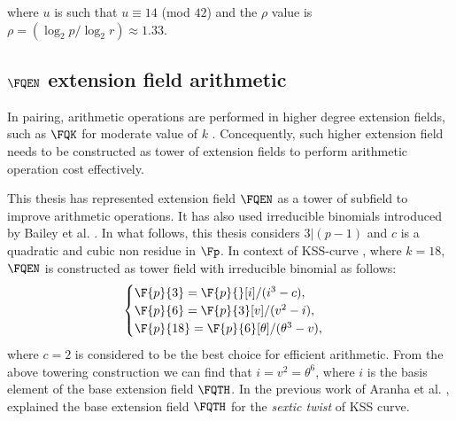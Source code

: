         where $u$ is such that $u \equiv 14$ (mod $42$) and the $\rho$ value is $\rho = (\log_2 p/\log_2 r) \approx 1.33$.
        
        
        
        \subsection{$\FQEN$ extension field arithmetic}
        In pairing, arithmetic  operations are performed in higher degree extension fields, such as $\FQK$  for moderate value of $k$ \cite{Silverman}. Concequently, such higher extension field needs to be constructed as tower of extension fields \cite{EPRINT:BenSco09} to perform arithmetic operation cost effectively.
        
        This thesis has  represented extension field $\FQEN$ as a tower of subfield to improve arithmetic operations. It has also used irreducible binomials introduced by Bailey et al. \cite{JC:BaiPaa01}. In what follows, this thesis considers $3|(p-1)$ and $c$ is a quadratic and cubic non residue in $\Fp$. In context  of KSS-curve \cite{EPRINT:KacSchSco07}, where $k=18$, $\FQEN$ is constructed as tower field with irreducible binomial as follows:
        \begin{equation}\label{eq:KSS_towering}
        \begin{cases}
        \F{p}{3} = \F{p}{}[i]/(i^3-c),  \\ 
        \F{p}{6} = \F{p}{3}[v]/(v^2-i),  \\ 
        \F{p}{18} = \F{p}{6}[\theta]/(\theta^3-v), \\ 
        \end{cases}
        \end{equation}
        where $c = 2$ is considered to be the best choice for efficient arithmetic.
        From the above towering construction we can find that $i=v^2=\theta^6$, where $i$ is the basis element of the base extension field $\FQTH$. 
        In the previous work of Aranha et al. \cite{PAIRING:AFKMR12}, explained the base extension field $\FQTH$ for the \textit{sextic twist} of KSS curve.
        
